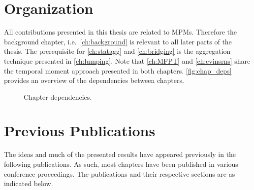 \section{Organization}
All contributions presented in this thesis are related to \aclp{MPM}.
Therefore the background chapter, i.e.\ \autoref{ch:background} is relevant
to all later parts of the thesis.
The prerequisite for \autoref{ch:statagg} and \autoref{ch:bridging} is the aggregation
technique presented in \autoref{ch:lumping}.
Note that \autoref{ch:MFPT} and \autoref{ch:cvinsrns} share the temporal moment approach presented
in both chapters.
\autoref{fig:chap_deps} provides an overview of the dependencies between chapters.
\begin{figure}[htb]
	\centering
{}
	\caption{\label{fig:chap_deps}Chapter dependencies.}
\end{figure}


\section{Previous Publications}%
The ideas and much of the presented results have appeared previously in the following publications.
As such, most chapters have been published in various conference proceedings.
The publications and their respective sections are as indicated below.

